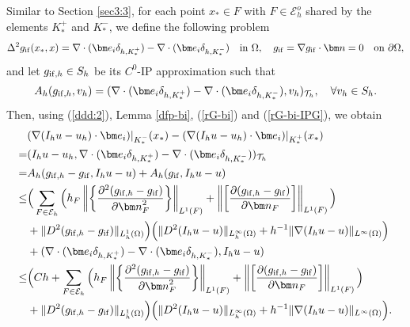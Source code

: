 \documentclass[1996/10/24]{amsart}
\theoremstyle{definition}
\numberwithin{equation}{section}
\begin{document}
Similar to Section \ref{sec3:3}, for each point $x_{\ast}\in F$ with $F\in\mathcal{E}_h^o$ shared by the elements $K^+_{\ast}$ and $K^-_{\ast}$,
we define the following problem
\begin{align}
\Delta^2g_{{\rm if}}(x_{\ast},x)=\nabla\cdot({\bm e}_i\delta_{h,K^+_{\ast}})-\nabla\cdot({\bm e}_i\delta_{h,K^-_{\ast}})\quad {\rm in}~\Omega,\quad
g_{{\rm if}}=\nabla g_{{\rm if}}\cdot{\bm n}=0\quad {\rm on}~\partial\Omega,\label{rG-bi}
\end{align}
and let $g_{{\rm if},h}\in S_h$ be its $C^0$-IP approximation such that
\begin{align}
A_h(g_{{\rm if},h},v_h)=(\nabla\cdot({\bm e}_i\delta_{h,K^+_{\ast}})-\nabla\cdot({\bm e}_i\delta_{h,K^-_{\ast}}),v_h)_{\mathcal{T}_h},\quad \forall v_h\in S_h.\label{rG-bi-IPG}
\end{align}
Then, using (\ref{ddd:2}), Lemma \ref{dfp-bi}, (\ref{rG-bi}) and (\ref{rG-bi-IPG}), we obtain
\begin{align}
&(\nabla (I_hu-u_h)\cdot{\bm e}_i)|_{K^-_{\ast}}(x_{\ast})-(\nabla (I_hu-u_h)\cdot{\bm e}_i)|_{K^+_{\ast}}(x_{\ast})\nonumber\\
=&(I_hu-u_h,\nabla\cdot({\bm e}_i\delta_{h,K^+_{\ast}})-\nabla\cdot({\bm e}_i\delta_{h,K^-_{\ast}}))_{\mathcal{T}_h}\nonumber\\
=&A_h(g_{{\rm if},h}-g_{{\rm if}},I_hu-u)+A_h(g_{{\rm if}},I_hu-u)\nonumber\\
\leq&\Big(\sum_{F\in\mathcal{E}_h}\Big(h_F\left\|\left\{\frac{\partial^2(g_{{\rm if},h}-g_{{\rm if}})}{\partial{\bm n}_F^2}\right\}\right\|_{L^1(F)}+\left\|\left[\frac{\partial(g_{{\rm if},h}-g_{{\rm if}})}{\partial{\bm n}_F}\right]\right\|_{L^1(F)}\Big)\label{rG-bi:1}\\
&+\|D^2(g_{{\rm if},h}-g_{{\rm if}})\|_{L_h^1(\Omega)}\Big)\Big(\|D^2(I_hu-u)\|_{L_h^{\infty}(\Omega)}+h^{-1}\|\nabla(I_hu-u)\|_{L^{\infty}(\Omega)}\Big)\nonumber\\
&+(\nabla\cdot({\bm e}_i\delta_{h,K^+_{\ast}})-\nabla\cdot({\bm e}_i\delta_{h,K^-_{\ast}}),I_hu-u)\nonumber\\
\leq&\Big(Ch+\sum_{F\in\mathcal{E}_h}\Big(h_F\left\|\left\{\frac{\partial^2(g_{{\rm if},h}-g_{{\rm if}})}{\partial{\bm n}_F^2}\right\}\right\|_{L^1(F)}+\left\|\left[\frac{\partial(g_{{\rm if},h}-g_{{\rm if}})}{\partial{\bm n}_F}\right]\right\|_{L^1(F)}\Big)\nonumber\\
&+\|D^2(g_{{\rm if},h}-g_{{\rm if}})\|_{L_h^1(\Omega)}\Big)\Big(\|D^2(I_hu-u)\|_{L_h^{\infty}(\Omega)}+h^{-1}\|\nabla(I_hu-u)\|_{L^{\infty}(\Omega)}\Big).\nonumber
\end{align}
\end{document}
